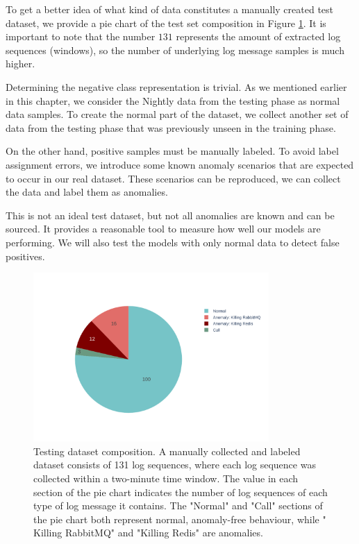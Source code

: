 To get a better idea of what kind of data constitutes a manually created test dataset, we provide a pie chart of the test set composition in Figure \ref{fig:testset-composition}. It is important to note that the number $131$ represents the amount of extracted log sequences (windows), so the number of underlying log message samples is much higher.

Determining the negative class representation is trivial. As we mentioned earlier in this chapter, we consider the Nightly data from the testing phase as normal data samples. To create the normal part of the dataset, we collect another set of data from the testing phase that was previously unseen in the training phase. 

On the other hand, positive samples must be manually labeled. To avoid label assignment errors, we introduce some known anomaly scenarios that are expected to occur in our real dataset. These scenarios can be reproduced, we can collect the data and label them as anomalies. 

This is not an ideal test dataset, but not all anomalies are known and can be sourced. It provides a reasonable tool to measure how well our models are performing. We will also test the models with only normal data to detect false positives. 

\begin{figure}[h]
    \centering
    \includegraphics[width=0.8\textwidth]{img/testset-composition.pdf}
    \caption{Testing dataset composition. A manually collected and labeled dataset consists of 131 log sequences, where each log sequence was collected within a two-minute time window. The value in each section of the pie chart indicates the number of log sequences of each type of log message it contains. The "Normal" and "Call" sections of the pie chart both represent normal, anomaly-free behaviour, while " Killing RabbitMQ" and "Killing Redis" are anomalies.}
    \label{fig:testset-composition}
\end{figure}

